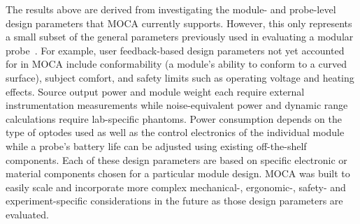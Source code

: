 The results above are derived from investigating the module- and probe-level design parameters that \ac{MOCA} currently supports. However, this only represents a small subset of the general parameters previously used in evaluating a modular probe~\cite{Zhao2017}. For example, user feedback-based design parameters not yet accounted for in \ac{MOCA} include conformability (a module's ability to conform to a curved surface), subject comfort, and safety limits such as operating voltage and heating effects. Source output power and module weight each require external instrumentation measurements while noise-equivalent power and dynamic range calculations require lab-specific phantoms. Power consumption depends on the type of optodes used as well as the control electronics of the individual module while a probe's battery life can be adjusted using existing off-the-shelf components. Each of these design parameters are based on specific electronic or material components chosen for a particular module design. \ac{MOCA} was built to easily scale and incorporate more complex mechanical-, ergonomic-, safety- and experiment-specific considerations in the future as those design parameters are evaluated.

